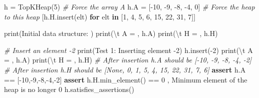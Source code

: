 \documentclass[
]{article}
\newenvironment{Shaded}{}{}
\newcommand{\BuiltInTok}[1]{\textcolor[rgb]{0.00,0.50,0.00}{#1}}
\newcommand{\CharTok}[1]{\textcolor[rgb]{0.25,0.44,0.63}{#1}}
\newcommand{\CommentTok}[1]{\textcolor[rgb]{0.38,0.63,0.69}{\textit{#1}}}
\newcommand{\ControlFlowTok}[1]{\textcolor[rgb]{0.00,0.44,0.13}{\textbf{#1}}}
\newcommand{\DecValTok}[1]{\textcolor[rgb]{0.25,0.63,0.44}{#1}}
\newcommand{\KeywordTok}[1]{\textcolor[rgb]{0.00,0.44,0.13}{\textbf{#1}}}
\newcommand{\NormalTok}[1]{#1}
\newcommand{\OperatorTok}[1]{\textcolor[rgb]{0.40,0.40,0.40}{#1}}
\newcommand{\StringTok}[1]{\textcolor[rgb]{0.25,0.44,0.63}{#1}}
\begin{document}
\begin{Shaded}
\begin{Highlighting}[]
\NormalTok{h }\OperatorTok{=}\NormalTok{ TopKHeap(}\DecValTok{5}\NormalTok{)}
\CommentTok{\# Force the array A}
\NormalTok{h.A }\OperatorTok{=}\NormalTok{ [}\OperatorTok{{-}}\DecValTok{10}\NormalTok{, }\OperatorTok{{-}}\DecValTok{9}\NormalTok{, }\OperatorTok{{-}}\DecValTok{8}\NormalTok{, }\OperatorTok{{-}}\DecValTok{4}\NormalTok{, }\DecValTok{0}\NormalTok{]}
\CommentTok{\# Force the heap to this heap}
\NormalTok{[h.H.insert(elt) }\ControlFlowTok{for}\NormalTok{ elt }\KeywordTok{in}\NormalTok{  [}\DecValTok{1}\NormalTok{, }\DecValTok{4}\NormalTok{, }\DecValTok{5}\NormalTok{, }\DecValTok{6}\NormalTok{, }\DecValTok{15}\NormalTok{, }\DecValTok{22}\NormalTok{, }\DecValTok{31}\NormalTok{, }\DecValTok{7}\NormalTok{]]}

\BuiltInTok{print}\NormalTok{(}\StringTok{\textquotesingle{}Initial data structure: \textquotesingle{}}\NormalTok{)}
\BuiltInTok{print}\NormalTok{(}\StringTok{\textquotesingle{}}\CharTok{\textbackslash{}t}\StringTok{ A = \textquotesingle{}}\NormalTok{, h.A)}
\BuiltInTok{print}\NormalTok{(}\StringTok{\textquotesingle{}}\CharTok{\textbackslash{}t}\StringTok{ H = \textquotesingle{}}\NormalTok{, h.H)}

\CommentTok{\# Insert an element {-}2}
\BuiltInTok{print}\NormalTok{(}\StringTok{\textquotesingle{}Test 1: Inserting element {-}2\textquotesingle{}}\NormalTok{)}
\NormalTok{h.insert(}\OperatorTok{{-}}\DecValTok{2}\NormalTok{)}
\BuiltInTok{print}\NormalTok{(}\StringTok{\textquotesingle{}}\CharTok{\textbackslash{}t}\StringTok{ A = \textquotesingle{}}\NormalTok{, h.A)}
\BuiltInTok{print}\NormalTok{(}\StringTok{\textquotesingle{}}\CharTok{\textbackslash{}t}\StringTok{ H = \textquotesingle{}}\NormalTok{, h.H)}
\CommentTok{\# After insertion h.A should be [{-}10, {-}9, {-}8, {-}4, {-}2]}
\CommentTok{\# After insertion h.H should be [None, 0, 1, 5, 4, 15, 22, 31, 7, 6]}
\ControlFlowTok{assert}\NormalTok{ h.A }\OperatorTok{==}\NormalTok{ [}\OperatorTok{{-}}\DecValTok{10}\NormalTok{,}\OperatorTok{{-}}\DecValTok{9}\NormalTok{,}\OperatorTok{{-}}\DecValTok{8}\NormalTok{,}\OperatorTok{{-}}\DecValTok{4}\NormalTok{,}\OperatorTok{{-}}\DecValTok{2}\NormalTok{]}
\ControlFlowTok{assert}\NormalTok{ h.H.min\_element() }\OperatorTok{==} \DecValTok{0}\NormalTok{ , }\StringTok{\textquotesingle{}Minimum element of the heap is no longer 0\textquotesingle{}}
\NormalTok{h.satisfies\_assertions()}


\end{Highlighting}
\end{Shaded}
\end{document}
